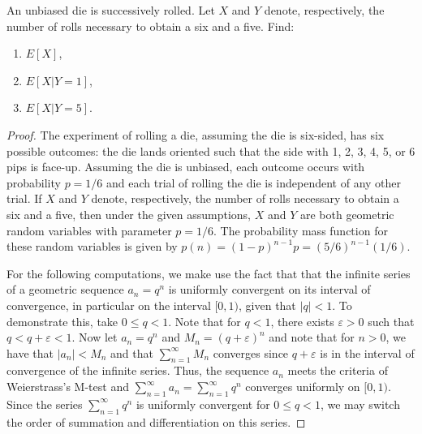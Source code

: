 \begin{problem}{3.8}
  An unbiased die is successively rolled. Let $X$ and $Y$ denote, respectively, the number
  of rolls necessary to obtain a six and a five. Find:
  \begin{enumerate}
    \item $E[X]$,
    \item $E[X|Y=1]$,
    \item $E[X|Y=5]$.
  \end{enumerate}
\end{problem}

\begin{proof}
  The experiment of rolling a die, assuming the die is six-sided, has
  six possible outcomes: the die lands oriented such that the side with 1, 2, 3, 4, 5, or 6
  pips is face-up. Assuming the die is unbiased, each outcome occurs with probability
  $p=1/6$ and each trial of rolling the die is independent of any other trial.
  If $X$ and $Y$ denote, respectively, the number
  of rolls necessary to obtain a six and a five, then under the given assumptions,
  $X$ and $Y$ are both geometric random variables with parameter $p=1/6$.
  The probability mass function for these random variables is given by $p(n) = (1-p)^{n-1}p = (5/6)^{n-1}(1/6)$.

  For the following computations, we make use the fact that that the infinite series
  of a geometric sequence $a_n = q^n$ is uniformly convergent on its interval of convergence,
  in particular on the interval $[0, 1)$, given that $|q| < 1$. To demonstrate this, take $0 \leq q < 1$.
  Note that for $q < 1$, there exists $\varepsilon > 0$ such that $q < q + \varepsilon < 1$.
  Now let $a_n = q ^ n$ and $M_n = (q + \varepsilon) ^ n$ and note that for $n > 0$,
  we have that $|a_n| <  M_n$ and that $\sum_{n=1}^{\infty}M_n$ converges since $q + \varepsilon$
  is in the interval of convergence of the infinite series. Thus, the sequence
  $a_n$ meets the criteria of Weierstrass's M-test and $\sum_{n=1}^\infty a_n = \sum_{n=1}^\infty q^n$ converges uniformly on $[0, 1)$.
  Since the series $\sum_{n=1}^\infty q^n$ is uniformly convergent for $0 \leq q < 1$, we
  may switch the order of summation and differentiation on this series.


\end{proof}

